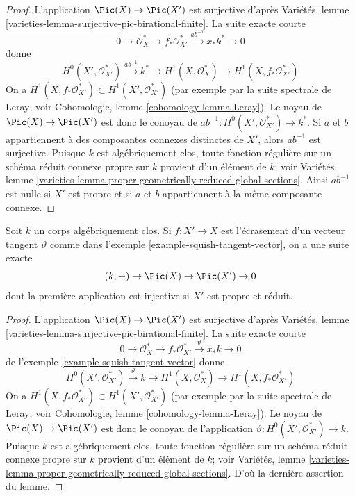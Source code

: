 \begin{proof}
L'application $\Pic(X) \to \Pic(X')$ est surjective d'après Variétés, lemme \ref{varieties-lemma-surjective-pic-birational-finite}. La suite exacte courte $$
0 \to \mathcal{O}_X^* \to f_*\mathcal{O}_{X'}^*
\xrightarrow{ab^{-1}} x_*k^* \to 0
$$ donne $$
H^0(X', \mathcal{O}_{X'}^*) \xrightarrow{ab^{-1}} k^* \to
H^1(X, \mathcal{O}_X^*) \to H^1(X, f_*\mathcal{O}_{X'}^*)
$$ On a $H^1(X, f_*\mathcal{O}_{X'}^*) \subset H^1(X', \mathcal{O}_{X'}^*)$ (par exemple par la suite spectrale de Leray; voir Cohomologie, lemme \ref{cohomology-lemma-Leray}). Le noyau de $\Pic(X) \to \Pic(X')$ est donc le conoyau de $ab^{-1} : H^0(X', \mathcal{O}_{X'}^*) \to k^*$. Si $a$ et $b$ appartiennent à des composantes connexes distinctes de $X'$, alors $ab^{-1}$ est surjective. Puisque $k$ est algébriquement clos, toute fonction régulière sur un schéma réduit connexe propre sur $k$ provient d'un élément de $k$; voir Variétés, lemme \ref{varieties-lemma-proper-geometrically-reduced-global-sections}. Ainsi $ab^{-1}$ est nulle si $X'$ est propre et si $a$ et $b$ appartiennent à la même composante connexe.
\end{proof}

\begin{lemma}
\label{lemma-squish-tangent-vector}
Soit $k$ un corps algébriquement clos. Si $f : X' \to X$ est l'écrasement d'un vecteur tangent $\vartheta$ comme dans l'exemple \ref{example-squish-tangent-vector}, on a une suite exacte $$
(k, +) \to \Pic(X) \to \Pic(X') \to 0
$$ dont la première application est injective si $X'$ est propre et réduit.
\end{lemma}

\begin{proof}
L'application $\Pic(X) \to \Pic(X')$ est surjective d'après Variétés, lemme \ref{varieties-lemma-surjective-pic-birational-finite}. La suite exacte courte $$
0 \to \mathcal{O}_X^* \to f_*\mathcal{O}_{X'}^*
\xrightarrow{\vartheta} x_*k \to 0
$$ de l'exemple \ref{example-squish-tangent-vector} donne $$
H^0(X', \mathcal{O}_{X'}^*) \xrightarrow{\vartheta} k \to
H^1(X, \mathcal{O}_X^*) \to H^1(X, f_*\mathcal{O}_{X'}^*)
$$ On a $H^1(X, f_*\mathcal{O}_{X'}^*) \subset H^1(X', \mathcal{O}_{X'}^*)$ (par exemple par la suite spectrale de Leray; voir Cohomologie, lemme \ref{cohomology-lemma-Leray}). Le noyau de $\Pic(X) \to \Pic(X')$ est donc le conoyau de l'application $\vartheta : H^0(X', \mathcal{O}_{X'}^*) \to k$. Puisque $k$ est algébriquement clos, toute fonction régulière sur un schéma réduit connexe propre sur $k$ provient d'un élément de $k$; voir Variétés, lemme \ref{varieties-lemma-proper-geometrically-reduced-global-sections}. D'où la dernière assertion du lemme.
\end{proof}


